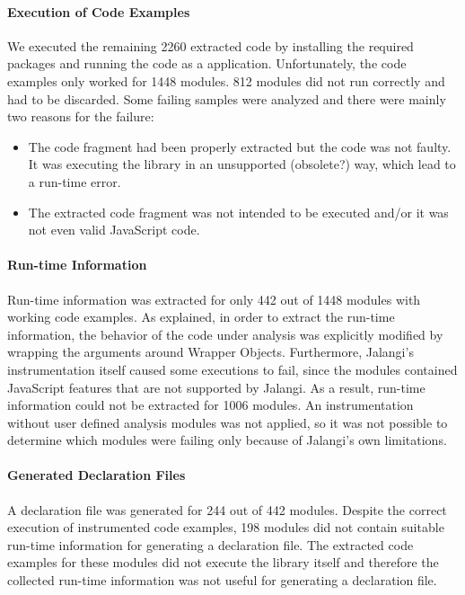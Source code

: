 \documentclass[a4paper,english,cleveref, autoref]{lipics-v2019}
\begin{document}
\paragraph*{Execution of Code Examples}
We executed the remaining 2260 extracted code by installing the
required packages and running the code as a \NodeJS{}
application. Unfortunately, the code examples only worked for 1448
modules. 812 modules did not run correctly and had to be
discarded. Some failing samples were analyzed and there were mainly
two reasons for the failure: 
\begin{itemize}
\item The code fragment had been properly extracted but the code was
  not faulty. It was executing the library in an unsupported
  (obsolete?) way, which lead to a run-time error.
\item The extracted code fragment was not intended to be executed
  and/or it was not even valid JavaScript code. 
\end{itemize}

\paragraph*{Run-time Information}
Run-time information was extracted for only 442 out of 1448 modules with working code examples. As explained, in order to extract the run-time information, the behavior of the code under analysis was explicitly modified by wrapping the arguments around Wrapper Objects. Furthermore, Jalangi’s instrumentation itself caused some executions to fail, since the modules contained JavaScript features that are not supported by Jalangi. As a result, run-time information could not be extracted for 1006 modules. An instrumentation without user defined analysis modules was not applied, so it was not possible to determine which modules were failing only because of Jalangi’s own limitations.

\paragraph*{Generated Declaration Files}
A declaration file was generated for 244 out of 442 modules. Despite the correct execution of instrumented code examples, 198 modules did not contain suitable run-time information for generating a declaration file. The extracted code examples for these modules did not execute the library itself and therefore the collected run-time information was not useful for generating a declaration file.
\end{document}
